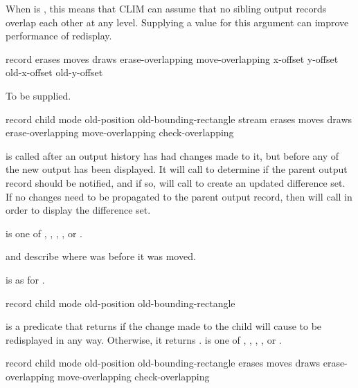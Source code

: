 When  is , this means that CLIM can assume
that no sibling output records overlap each other at any level.  Supplying a
 value for this argument can improve performance of redisplay.


 {record erases moves draws erase-overlapping move-overlapping
                                \optional x-offset y-offset old-x-offset old-y-offset}

 {To be supplied.}


            {record child mode old-position old-bounding-rectangle stream
             \optional erases moves draws erase-overlapping move-overlapping
             \key check-overlapping}

 is called after an output history has had
changes made to it, but before any of the new output has been displayed.  It
will call  to determine if the parent
output record should be notified, and if so, will call
 to create an updated difference set.  If no
changes need to be propagated to the parent output record, then
 will call  in
order to display the difference set.

 is one of , , , , or
.

 and  describe where 
was before it was moved.

 is as for .


 {record child mode 
                                                 old-position old-bounding-rectangle}

 is a predicate that returns 
if the change made to the child will cause  to be redisplayed in any
way.  Otherwise, it returns .   is one of ,
, , , or .

            {record child mode 
             \optional old-position old-bounding-rectangle
                       erases moves draws erase-overlapping move-overlapping check-overlapping}

